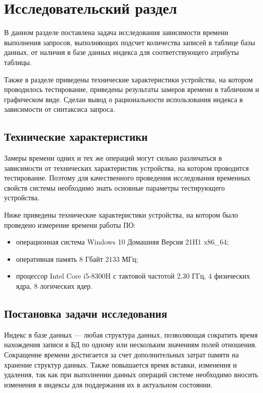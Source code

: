 \chapter{Исследовательский раздел}

В данном разделе поставлена задача исследования зависимости времени выполнения запросов, выполняющих подсчет количества записей в таблице базы данных, от наличия в базе данных индекса для соответствующего атрибуты таблицы.

Также в разделе приведены технические характеристики устройства, на котором проводилось тестирование, приведены результаты замеров времени в табличном и графическом виде. Сделан вывод о рациональности использования индекса в зависимости от синтаксиса запроса.


\section{Технические характеристики}

Замеры времени одних и тех же операций могут сильно различаться в зависимости от технических характеристик устройства, на котором проводится тестирование.
Поэтому для качественного проведения исследования временных свойств системы необходимо знать основные параметры тестирующего устройства. 

Ниже приведены технические характеристики устройства, на котором было проведено измерение времени работы ПО:

\begin{itemize}
	\item операционная система Windows 10 Домашняя Версия 21H1 x86\_64;
	\item оперативная память 8 Гбайт 2133 МГц;
	\item процессор Intel Core i5-8300H с тактовой частотой 2.30 ГГц, 4 физических ядра, 8 логических ядер.
\end{itemize}

\section{Постановка задачи исследования}
Индекс \cite{index} в базе данных --- любая структура данных, позволяющая сократить время нахождения записи в БД по одному или нескольким значениям полей отношения. Сокращение времени достигается за счет дополнительных затрат памяти на хранение структур данных. Также повышается время  вставки, изменения и удаления, так как при выполнении данных операций системе необходимо вносить изменения в индексы для поддержания их в актуальном состоянии.

